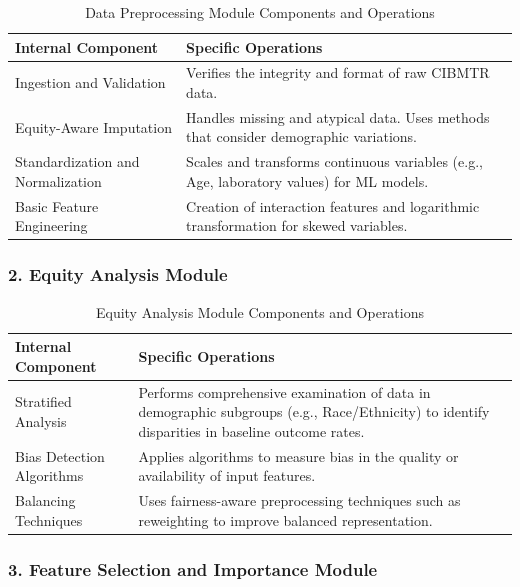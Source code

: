\begin{table}[H]
\centering
\begin{tabular}{|p{5cm}|p{9cm}|}
\hline
\textbf{Internal Component} & \textbf{Specific Operations} \\
\hline
Ingestion and Validation & Verifies the integrity and format of raw CIBMTR data. \\
\hline
Equity-Aware Imputation & Handles missing and atypical data. Uses methods that consider demographic variations. \\
\hline
Standardization and Normalization & Scales and transforms continuous variables (e.g., Age, laboratory values) for ML models. \\
\hline
Basic Feature Engineering & Creation of interaction features and logarithmic transformation for skewed variables. \\
\hline
\end{tabular}
\caption{Data Preprocessing Module Components and Operations}
\label{tab:preprocessing_module}
\end{table}

\subsubsection{2. Equity Analysis Module}

\begin{table}[H]
\centering
\begin{tabular}{|p{5cm}|p{9cm}|}
\hline
\textbf{Internal Component} & \textbf{Specific Operations} \\
\hline
Stratified Analysis & Performs comprehensive examination of data in demographic subgroups (e.g., Race/Ethnicity) to identify disparities in baseline outcome rates. \\
\hline
Bias Detection Algorithms & Applies algorithms to measure bias in the quality or availability of input features. \\
\hline
Balancing Techniques & Uses fairness-aware preprocessing techniques such as reweighting to improve balanced representation. \\
\hline
\end{tabular}
\caption{Equity Analysis Module Components and Operations}
\label{tab:equity_module}
\end{table}

\subsubsection{3. Feature Selection and Importance Module}

